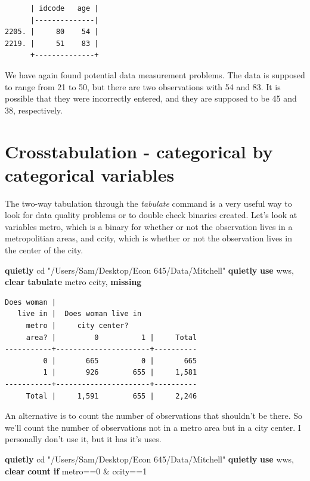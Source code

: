 \documentclass[
]{book}
\newenvironment{Shaded}{\begin{snugshade}}{\end{snugshade}}
\newcommand{\FunctionTok}[1]{\textcolor[rgb]{0.13,0.29,0.53}{\textbf{#1}}}
\newcommand{\KeywordTok}[1]{\textcolor[rgb]{0.13,0.29,0.53}{\textbf{#1}}}
\newcommand{\NormalTok}[1]{#1}
\newcommand{\StringTok}[1]{\textcolor[rgb]{0.31,0.60,0.02}{#1}}
\begin{document}
\begin{verbatim}
      | idcode   age |
      |--------------|
2205. |     80    54 |
2219. |     51    83 |
      +--------------+
\end{verbatim}

We have again found potential data measurement problems. The data is supposed to range from 21 to 50, but there are two observations with 54 and 83. It is possible that they were incorrectly entered, and they are supposed to be 45 and 38, respectively.

\section{Crosstabulation - categorical by categorical variables}\label{crosstabulation---categorical-by-categorical-variables}

The two-way tabulation through the \emph{tabulate} command is a very useful way to look for data quality problems or to double check binaries created. Let's look at variables metro, which is a binary for whether or not the observation lives in a metropolitian areas, and ccity, which is whether or not the observation lives in the center of the city.

\begin{Shaded}
\begin{Highlighting}[]
\KeywordTok{quietly}\NormalTok{ cd }\StringTok{"/Users/Sam/Desktop/Econ 645/Data/Mitchell"}
\KeywordTok{quietly} \KeywordTok{use}\NormalTok{ wws, }\KeywordTok{clear}
\KeywordTok{tabulate}\NormalTok{ metro ccity, }\FunctionTok{missing}
\end{Highlighting}
\end{Shaded}

\begin{verbatim}
Does woman |
   live in |  Does woman live in
     metro |     city center?
     area? |         0          1 |     Total
-----------+----------------------+----------
         0 |       665          0 |       665 
         1 |       926        655 |     1,581 
-----------+----------------------+----------
     Total |     1,591        655 |     2,246 
\end{verbatim}

An alternative is to count the number of observations that shouldn't be there. So we'll count the number of observations not in a metro area but in a city center. I personally don't use it, but it has it's uses.

\begin{Shaded}
\begin{Highlighting}[]
\KeywordTok{quietly}\NormalTok{ cd }\StringTok{"/Users/Sam/Desktop/Econ 645/Data/Mitchell"}
\KeywordTok{quietly} \KeywordTok{use}\NormalTok{ wws, }\KeywordTok{clear}
\FunctionTok{count} \KeywordTok{if}\NormalTok{ metro==0 \& ccity==1}
\end{Highlighting}
\end{Shaded}
\end{document}
